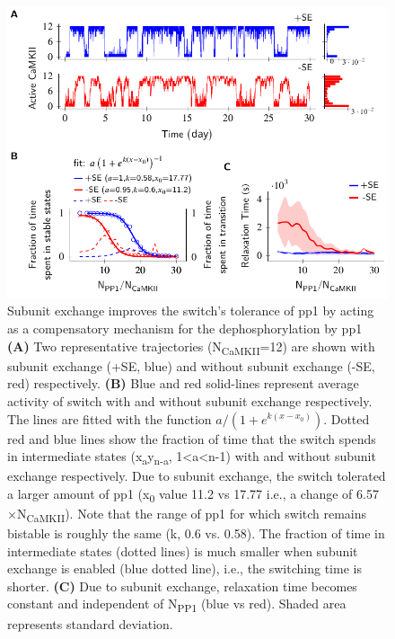 \documentclass[9pt,lineno,doublespacing]{elife}
\newcommand\SUB[2]{#1\textsubscript{#2}}
\begin{document}
\begin{figure}[ht]
    \includegraphics[width=140mm]{PaperFigures/elifeFigure2/figure_effect_of_tolerace_140mm.pdf}
    \caption{Subunit exchange improves the switch's tolerance of \gls{pp1} by
        acting as a compensatory mechanism for the dephosphorylation by \gls{pp1} 
        \textbf{(A)} Two representative trajectories (\SUB{N}{CaMKII}=12) are
        shown with subunit exchange (+SE, blue) and without
        subunit exchange (-SE, red) respectively. \textbf{(B)} Blue and red
        solid-lines represent average activity of switch with and without 
        subunit exchange respectively. The lines are fitted with the 
        function \({a}/\left({1+e^{k(x-x_0)}}\right)\).
        Dotted red and blue lines show the fraction of time that the switch
        spends in intermediate states (\SUB{x}{a}\SUB{y}{n-a}, 1<a<n-1) with
        and without subunit exchange respectively. Due to subunit exchange,
        the switch tolerated a larger amount of \gls{pp1} 
        (\SUB{x}{0} value 11.2 vs 17.77 i.e., a change of 6.57$\times$\SUB{N}{CaMKII}).
        Note that the range of \gls{pp1} for which switch remains bistable is roughly the 
        same (k, 0.6 vs. 0.58). The fraction of time in intermediate states (dotted lines)
	is much smaller when subunit exchange is enabled (blue dotted line),
        i.e., the switching time is shorter. \textbf{(C)} Due to subunit exchange, relaxation 
        time becomes constant and independent of \SUB{N}{PP1} (blue vs red). 
        Shaded area represents standard deviation.
    }\label{fig:tolerance_pp1}
\end{figure}
\end{document}

